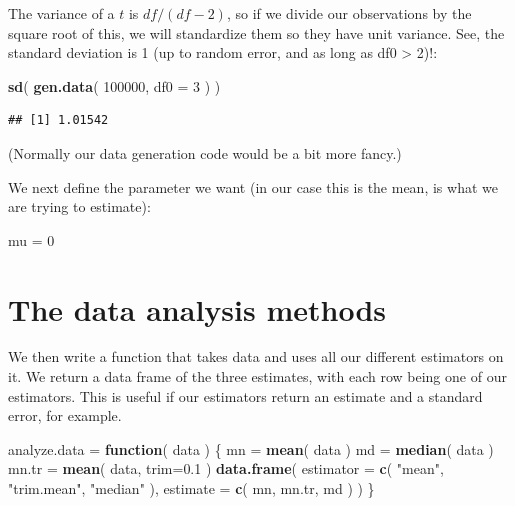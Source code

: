 \documentclass[
]{book}
\newenvironment{Shaded}{\begin{snugshade}}{\end{snugshade}}
\newcommand{\AttributeTok}[1]{\textcolor[rgb]{0.13,0.29,0.53}{#1}}
\newcommand{\ControlFlowTok}[1]{\textcolor[rgb]{0.13,0.29,0.53}{\textbf{#1}}}
\newcommand{\DecValTok}[1]{\textcolor[rgb]{0.00,0.00,0.81}{#1}}
\newcommand{\FloatTok}[1]{\textcolor[rgb]{0.00,0.00,0.81}{#1}}
\newcommand{\FunctionTok}[1]{\textcolor[rgb]{0.13,0.29,0.53}{\textbf{#1}}}
\newcommand{\NormalTok}[1]{#1}
\newcommand{\OtherTok}[1]{\textcolor[rgb]{0.56,0.35,0.01}{#1}}
\newcommand{\StringTok}[1]{\textcolor[rgb]{0.31,0.60,0.02}{#1}}
\begin{document}
The variance of a \(t\) is \(df/(df-2)\), so if we divide our observations by the
square root of this, we will standardize them so they have unit variance.
See, the standard deviation is 1 (up to random error, and as long as df0 \textgreater{}
2)!:

\begin{Shaded}
\begin{Highlighting}[]
\FunctionTok{sd}\NormalTok{( }\FunctionTok{gen.data}\NormalTok{( }\DecValTok{100000}\NormalTok{, }\AttributeTok{df0 =} \DecValTok{3}\NormalTok{ ) )}
\end{Highlighting}
\end{Shaded}

\begin{verbatim}
## [1] 1.01542
\end{verbatim}

(Normally our data generation code would be a bit more fancy.)

We next define the parameter we want (in our case this is the mean, is what
we are trying to estimate):

\begin{Shaded}
\begin{Highlighting}[]
\NormalTok{mu }\OtherTok{=} \DecValTok{0}
\end{Highlighting}
\end{Shaded}

\section{The data analysis methods}\label{the-data-analysis-methods}

We then write a function that takes data and uses all our different
estimators on it. We return a data frame of the three estimates, with each
row being one of our estimators. This is useful if our estimators return an
estimate and a standard error, for example.

\begin{Shaded}
\begin{Highlighting}[]
\NormalTok{analyze.data }\OtherTok{=} \ControlFlowTok{function}\NormalTok{( data ) \{}
\NormalTok{    mn }\OtherTok{=} \FunctionTok{mean}\NormalTok{( data )}
\NormalTok{    md }\OtherTok{=} \FunctionTok{median}\NormalTok{( data )}
\NormalTok{    mn.tr }\OtherTok{=} \FunctionTok{mean}\NormalTok{( data, }\AttributeTok{trim=}\FloatTok{0.1}\NormalTok{ )}
    \FunctionTok{data.frame}\NormalTok{( }\AttributeTok{estimator =} \FunctionTok{c}\NormalTok{( }\StringTok{"mean"}\NormalTok{, }\StringTok{"trim.mean"}\NormalTok{, }\StringTok{"median"}\NormalTok{ ),}
                \AttributeTok{estimate =} \FunctionTok{c}\NormalTok{( mn, mn.tr, md ) )}
\NormalTok{\}}
\end{Highlighting}
\end{Shaded}
\end{document}

